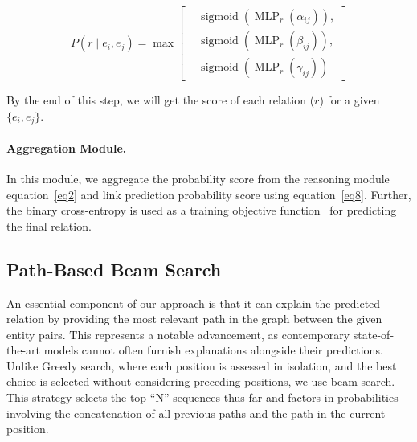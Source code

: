 \documentclass[letterpaper]{article} %
\begin{document}
\begin{equation}\label{eq2}
    P\left(r \mid e_{i}, e_{j}\right) = \max\left[
    \begin{aligned}
        &\operatorname{sigmoid}\left(\operatorname{MLP}_{r}\left(\alpha_{ij}\right)\right), \\
        &\operatorname{sigmoid}\left(\operatorname{MLP}_{r}\left(\beta_{ij}\right)\right), \\
        &\operatorname{sigmoid}\left(\operatorname{MLP}_{r}\left(\gamma_{ij}\right)\right)
    \end{aligned}
    \right]
\end{equation}


By the end of this step, we will get the score of each relation ($r$) for a given $\{e_i,e_j\}$.


\paragraph{\textbf{Aggregation Module.}} In this module, we aggregate the probability score from the reasoning module equation~\ref{eq2} and link prediction probability score using equation~\ref{eq8}. Further, the binary cross-entropy is used as a training objective function~\cite{yao-etal-2019-docred} for predicting the final relation.

\subsection{Path-Based Beam Search}
An essential component of our approach is that it can explain the predicted relation by providing the most relevant path in the graph between the given entity pairs. This represents a notable advancement, as contemporary state-of-the-art models cannot often furnish explanations alongside their predictions. Unlike Greedy search, where each position is assessed in isolation, and the best choice is selected without considering preceding positions, we use beam search. This strategy selects the top \enquote{N} sequences thus far and factors in probabilities involving the concatenation of all previous paths and the path in the current position.
\end{document}

